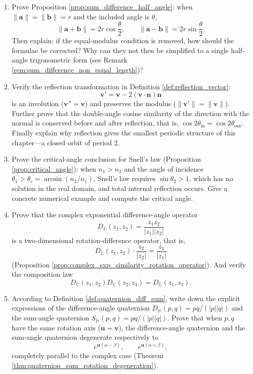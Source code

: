 \begin{enumerate}[leftmargin=3em, label=\textbf{Exercise \arabic*}]
    \item Prove Proposition \ref{prop:sum_difference_half_angle}:
    when $\|\mathbf{a}\|=\|\mathbf{b}\|=r$ and the included angle is $\theta$,
    \[
    \|\mathbf{a}+\mathbf{b}\|=2r\cos\frac{\theta}{2},\qquad
    \|\mathbf{a}-\mathbf{b}\|=2r\sin\frac{\theta}{2}.
    \]
    Then explain: if the equal-modulus condition is removed, how should the formulae be corrected? Why can they not then be simplified to a single half-angle trigonometric form
    (see Remark \ref{rem:sum_difference_non_equal_length})?

    \item Verify the reflection transformation in Definition \ref{def:reflection_vector}:
    \[
    \mathbf{v}'=\mathbf{v}-2(\mathbf{v}\cdot\mathbf{n})\mathbf{n}
    \]
    is an involution ($\mathbf{v}''=\mathbf{v}$) and preserves the modulus ($\|\mathbf{v}'\|=\|\mathbf{v}\|$).
    Further prove that the double-angle cosine similarity of the direction with the normal is conserved before and after reflection, that is,
    $\cos 2\theta_{\text{in}}=\cos 2\theta_{\text{out}}$.
    Finally explain why reflection gives the smallest periodic structure of this chapter---a closed orbit of period $2$.

    \item Prove the critical-angle conclusion for Snell's law (Proposition \ref{prop:critical_angle}):
    when $n_1>n_2$ and the angle of incidence $\theta_1>\theta_c=\arcsin(n_2/n_1)$,
    Snell's law requires $\sin\theta_2>1$, which has no solution in the real domain, and total internal reflection occurs.
    Give a concrete numerical example and compute the critical angle.

    \item Prove that the complex exponential difference-angle operator
    \[
    D_{\mathbb{C}}(z_1,z_2)=\frac{z_1\overline{z_2}}{|z_1||z_2|}
    \]
    is a two-dimensional rotation-difference operator, that is,
    \[
    D_{\mathbb{C}}(z_1,z_2)\cdot\frac{z_2}{|z_2|}=\frac{z_1}{|z_1|}
    \]
    (Proposition \ref{prop:complex_exp_similarity_rotation_operator}).
    And verify the composition law
    \[
    D_{\mathbb{C}}(z_1,z_2)D_{\mathbb{C}}(z_2,z_3)=D_{\mathbb{C}}(z_1,z_3).
    \]

    \item According to Definition \ref{def:quaternion_diff_sum}, write down the explicit expressions of the difference-angle quaternion
    $D_{\mathbb{H}}(p,q)=p\overline{q}/(|p||q|)$ and the sum-angle quaternion
    $S_{\mathbb{H}}(p,q)=pq/(|p||q|)$.
    Prove that when $p,q$ have the same rotation axis ($\mathbf{u}=\mathbf{v}$),
    the difference-angle quaternion and the sum-angle quaternion degenerate respectively to
    \[
    e^{\mathbf{u}(\alpha-\beta)},\qquad e^{\mathbf{u}(\alpha+\beta)},
    \]
    completely parallel to the complex case (Theorem \ref{thm:quaternion_sum_rotation_degeneration}).


\end{enumerate}
